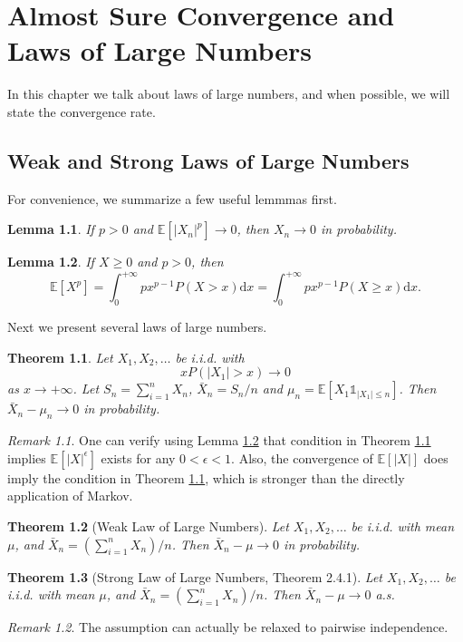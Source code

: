 \documentclass[openany]{book}
\newtheorem{lemma}{Lemma}[chapter]
\newtheorem{theorem}{Theorem}[chapter]
\theoremstyle{definition}
\theoremstyle{remark}
\newtheorem*{remark}{Remark}
\begin{document}
\chapter{Almost Sure Convergence and Laws of Large Numbers}\label{chp:LLN}
In this chapter we talk about laws of large numbers, and when possible, we will state the convergence rate.

\section{Weak and Strong Laws of Large Numbers}
For convenience, we summarize a few useful lemmmas first.
\begin{lemma}
    If $p>0$ and $\mathbb{E}\left[|X_n|^p\right]\to0$, then $X_n\to0$ in probability.
\end{lemma}
\begin{lemma}\label{lem:momentFubini}
    If $X\ge0$ and $p>0$, then
    \begin{equation*}
        \mathbb{E}[X^p]=\int_0^{+\infty}px^{p-1}P(X>x)\mathrm{d}x=\int_0^{+\infty}px^{p-1}P(X\ge x)\mathrm{d}x.
    \end{equation*}
\end{lemma}

Next we present several laws of large numbers.
\begin{theorem}\label{thm:generalWeakLaw}
    Let $X_1,X_2,\ldots$ be i.i.d. with
    \begin{equation*}
        xP\left(|X_1|>x\right)\to0
    \end{equation*}
    as $x\to+\infty$. Let $S_n=\sum_{i=1}^{n}X_n$, $\bar{X}_n=S_n/n$ and $\mu_n=\mathbb{E}\left[X_1\mathds{1}_{|X_1|\le n}\right]$. Then $\bar{X}_n-\mu_n\to0$ in probability.
\end{theorem}
\begin{remark}
    One can verify using Lemma \ref{lem:momentFubini} that condition in Theorem \ref{thm:generalWeakLaw} implies $\mathbb{E}\left[|X|^{\epsilon}\right]$ exists for any $0<\epsilon<1$. Also, the convergence of $\mathbb{E}\left[|X|\right]$ does imply the condition in Theorem \ref{thm:generalWeakLaw}, which is stronger than the directly application of Markov.
\end{remark}
\begin{theorem}[Weak Law of Large Numbers]\label{thm:weakLaw}
    Let $X_1,X_2,\ldots$ be i.i.d. with mean $\mu$, and $\bar{X}_n=\left(\sum_{i=1}^{n}X_n\right)/n$. Then $\bar{X}_n-\mu\to0$ in probability.
\end{theorem}
\begin{theorem}[Strong Law of Large Numbers, \cite{D10} Theorem 2.4.1]\label{thm:strongLaw}
    Let $X_1,X_2,\ldots$ be i.i.d. with mean $\mu$, and $\bar{X}_n=\left(\sum_{i=1}^{n}X_n\right)/n$. Then $\bar{X}_n-\mu\to0$ a.s.
\end{theorem}
\begin{remark}
    The assumption can actually be relaxed to pairwise independence.
\end{remark}
\end{document}
